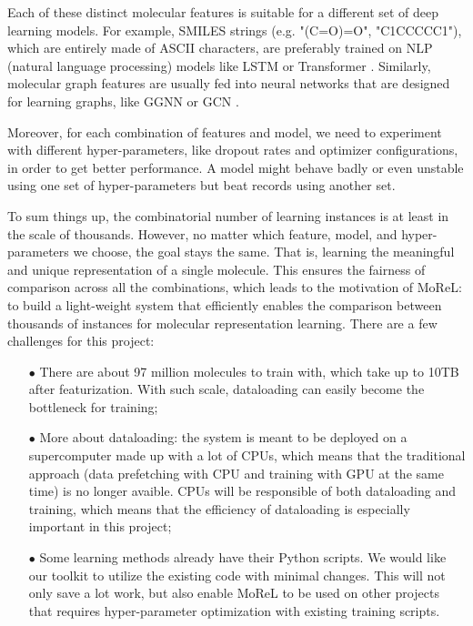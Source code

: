 \documentclass[conference]{IEEEtran}
\begin{document}
Each of these distinct molecular features is suitable for a different set of deep learning models. 
For example, SMILES strings (e.g. "(C=O)=O", "C1CCCCC1"), which are entirely made of ASCII characters, are preferably trained on NLP (natural language processing) models like LSTM \cite{lstm} or Transformer \cite{transformer}. 
Similarly, molecular graph features are usually fed into neural networks that are designed for learning graphs, like GGNN \cite{ggnn} or GCN \cite{gcn}. 

Moreover, for each combination of features and model, we need to experiment with different hyper-parameters, like dropout rates and optimizer configurations, in order to get better performance. 
A model might behave badly or even unstable using one set of hyper-parameters but beat records using another set. 

To sum things up, the combinatorial number of learning instances is at least in the scale of thousands. 
However, no matter which feature, model, and hyper-parameters we choose, the goal stays the same. That is, learning the meaningful and unique representation of a single molecule. 
This ensures the fairness of comparison across all the combinations, which leads to the motivation of MoReL: to build a light-weight system that efficiently enables the comparison between thousands of instances for molecular representation learning. 
There are a few challenges for this project:
\begin{itemize}
	\item[$\bullet$]  There are about 97 million molecules to train with, which take up to 10TB after featurization. With such scale, dataloading can easily become the bottleneck for training;
	\item[$\bullet$]  More about dataloading: the system is meant to be deployed on a supercomputer made up with a lot of CPUs, which means that the traditional approach (data prefetching with CPU and training with GPU at the same time) is no longer avaible. CPUs will be responsible of both dataloading and training, which means that the efficiency of dataloading is especially important in this project;
	\item[$\bullet$]  Some learning methods already have their Python scripts. We would like our toolkit to utilize the existing code with minimal changes. This will not only save a lot work, but also enable MoReL to be used on other projects that requires hyper-parameter optimization with existing training scripts. 
\end{itemize}
\end{document}
